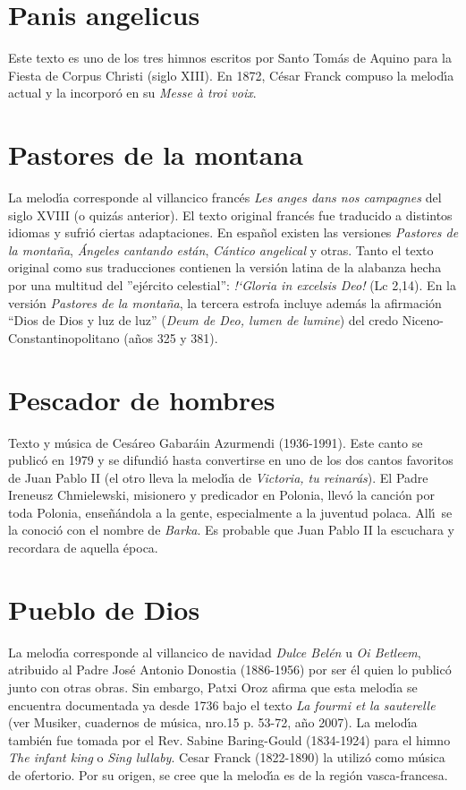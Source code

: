 \documentclass[landscape,12pt]{report}
\begin{document}
\section*{\small Panis angelicus} \noindent\footnotesize Este texto es uno de los tres himnos escritos por Santo Tom\'as de Aquino para la Fiesta de Corpus Christi (siglo XIII). En 1872, C\'esar Franck compuso la melod\'\i a actual y la incorpor\'o en su \textit{Messe \`a troi voix}.
\section*{\small Pastores de la montana} \noindent\footnotesize La melod\'\i a corresponde al villancico franc\'es \textit{Les anges dans nos campagnes} del siglo XVIII (o quiz\'as anterior). El texto original franc\'es fue traducido a distintos idiomas y sufri\'o ciertas adaptaciones. En espa\~nol existen las versiones \textit{Pastores de la monta\~na}, \textit{\'Angeles cantando est\'an}, \textit{C\'antico angelical} y otras. Tanto el texto original como sus traducciones contienen la versi\'on latina de la alabanza hecha por una multitud del ''ej\'ercito celestial'': \textit{!`Gloria in excelsis Deo!} (Lc 2,14). En la versi\'on \textit{Pastores de la monta\~na}, la tercera estrofa incluye adem\'as la afirmaci\'on ``Dios de Dios y luz de luz'' (\textit{Deum de Deo, lumen de lumine}) del credo Niceno-Constantinopolitano (a\~nos 325 y 381).
\section*{\small Pescador de hombres} \noindent\footnotesize Texto y m\'usica de Ces\'areo Gabar\'ain Azurmendi (1936-1991). Este canto se public\'o en 1979 y se difundi\'o hasta convertirse en uno de los dos cantos favoritos de Juan Pablo II (el otro lleva la melod\'\i a de \textit{Victoria, tu reinar\'as}). El Padre Ireneusz Chmielewski, misionero y predicador en Polonia, llev\'o la canci\'on por toda Polonia, ense\~n\'andola a la gente, especialmente a la juventud polaca. All\'\i\ se la conoci\'o con el nombre de \textit{Barka}. Es probable que Juan Pablo II la escuchara y recordara de aquella \'epoca.

\section*{\small Pueblo de Dios} \noindent\footnotesize La melod\'\i a corresponde al villancico de navidad \emph{Dulce Bel\'en} u \textit{Oi Betleem}, atribuido al Padre Jos\'e Antonio Donostia (1886-1956) por ser \'el quien lo public\'o junto con otras obras. Sin embargo, Patxi Oroz afirma que esta melod\'\i a se encuentra documentada ya desde 1736 bajo el texto \textit{La fourmi et la sauterelle} (ver Musiker, cuadernos de m\'usica, nro.15 p. 53-72, a\~no 2007). La melod\'\i a tambi\'en fue tomada por el Rev. Sabine Baring-Gould (1834-1924) para el himno \textit{The infant king} o \textit{Sing lullaby}. Cesar Franck (1822-1890) la utiliz\'o como m\'usica de ofertorio. Por su origen, se cree que la melod\'\i a es de la regi\'on vasca-francesa. 
\end{document}
